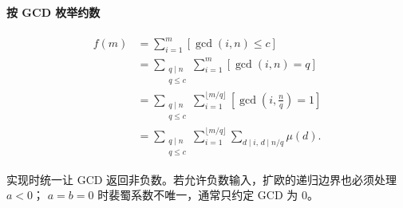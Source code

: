 \paragraph{按 GCD 枚举约数}

\[
  \begin{aligned}
  f(m)
  &=\sum_{i=1}^{m}[\gcd(i,n)\le c]\\
  &=\sum_{\substack{q\mid n\\q\le c}}
    \sum_{i=1}^{m}[\gcd(i,n)=q]\\
  &=\sum_{\substack{q\mid n\\q\le c}}
    \sum_{i=1}^{\lfloor m/q\rfloor}
    \left[\gcd\!\left(i,\frac nq\right)=1\right]\\
  &=\sum_{\substack{q\mid n\\q\le c}}
    \sum_{i=1}^{\lfloor m/q\rfloor}
    \sum_{d\mid i,\,d\mid n/q}\mu(d).
  \end{aligned}
\]

\begin{icpcwarning}[边界与符号]
  实现时统一让 GCD 返回非负数。若允许负数输入，扩欧的递归边界也必须处理 $a<0$；
  $a=b=0$ 时裴蜀系数不唯一，通常只约定 GCD 为 $0$。
\end{icpcwarning}
